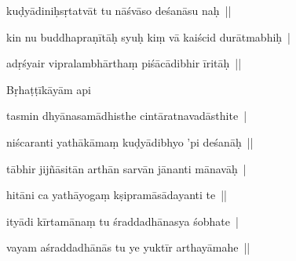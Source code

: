 \documentclass[article,12pt,a4paper]{memoir}%
\newcounter{parCount}
\begin{document}
	  
	  \pstart \leavevmode%
	kuḍyādiniḥsṛtatvāt tu nāśvāso deśanāsu naḥ || 
	{}
	\pend%
      

	  
	  \pstart \leavevmode%
	kin nu buddhapraṇītāḥ syuḥ kiṃ vā kaiścid durātmabhiḥ | 
	{}
	\pend%
      

	  
	  \pstart \leavevmode%
	adṛśyair vipralambhārthaṃ piśācādibhir īritāḥ ||
	{}
	\pend%
      

	  
	  \pstart \leavevmode%
	Bṛhaṭṭīkāyām api 
	{}
	\pend%
      

	  
	  \pstart \leavevmode%
	tasmin dhyānasamādhisthe cintāratnavadāsthite | 
	{}
	\pend%
      

	  
	  \pstart \leavevmode%
	niścaranti yathākāmaṃ kuḍyādibhyo 'pi deśanāḥ || 
	{}
	\pend%
      

	  
	  \pstart \leavevmode%
	tābhir jijñāsitān arthān sarvān jānanti mānavāḥ | 
	{}
	\pend%
      

	  
	  \pstart \leavevmode%
	hitāni ca yathāyogaṃ kṣipramāsādayanti te || 
	{}
	\pend%
      

	  
	  \pstart \leavevmode%
	ityādi kīrtamānaṃ tu śraddadhānasya śobhate | 
	{}
	\pend%
      

	  
	  \pstart \leavevmode%
	vayam aśraddadhānās tu ye yuktīr arthayāmahe || 
	{}
	\pend%
      
\end{document}
